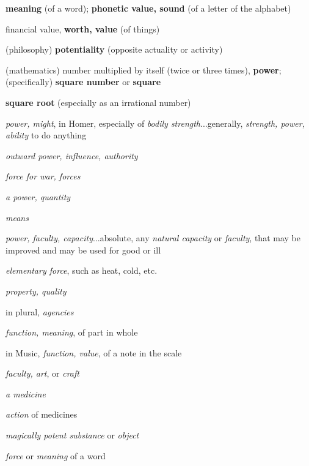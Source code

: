 \begin{compactdesc}
\begin{compactitem}
							\item[9] \textbf{meaning} (of a word); \textbf{phonetic value, sound} (of a letter of the alphabet)
							\item[10] financial value, \textbf{worth, value} (of things)
							\item[11] (philosophy) \textbf{potentiality} (opposite actuality or activity)
							\item[12] (mathematics) number multiplied by itself (twice or three times), \textbf{power}; (specifically) \textbf{square number} or \textbf{square}
							\item[13] \textbf{square root} (especially as an irrational number)
						\end{compactitem}
					\item[LSJ 452a, PDF 523] \textbf{}
						\begin{compactitem}
							\item[I.1] \textit{power, might}, in Homer, especially of \textit{bodily strength}...generally, \textit{strength, power, ability} to do anything
							\item[I.2] \textit{outward power, influence, authority}
							\item[I.3] \textit{force for war, forces}
							\item[I.4] \textit{a power, quantity}
							\item[I.5] \textit{means}
							\item[II.1] \textit{power, faculty, capacity}...absolute, any \textit{natural capacity} or \textit{faculty}, that may be improved and may be used for good or ill
							\item[II.2.a] \textit{elementary force}, such as heat, cold, etc.
							\item[II.2.b] \textit{property, quality}
							\item[II.2.c] in plural, \textit{agencies}
							\item[II.2.d] \textit{function, meaning}, of part in whole
							\item[II.2.e] in Music, \textit{function, value}, of a note in the scale
							\item[II.3] \textit{faculty, art}, or \textit{craft}
							\item[II.4.a] \textit{a medicine}
							\item[II.4.b] \textit{action} of medicines
							\item[II.5] \textit{magically potent substance} or \textit{object}
							\item[III.1.a] \textit{force} or \textit{meaning} of a word

\end{compactitem}
\end{compactdesc}
